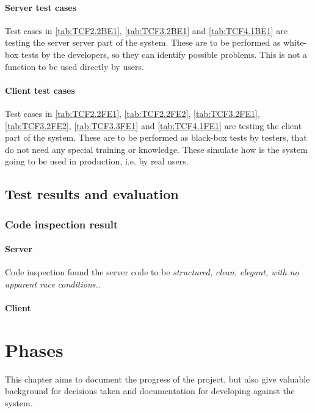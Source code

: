 \documentclass[11pt]{book}
\begin{document}
\subsubsection{Server test cases}

Test cases in \ref{tab:TCF2.2BE1}, \ref{tab:TCF3.2BE1} and \ref{tab:TCF4.1BE1} are testing the server server part of the system. These are to be performed as white-box tests by the developers, so they can identify possible problems. This is not a function to be used directly by users.

\subsubsection{Client test cases} \label{sec:fe-test-cases}

Test cases in \ref{tab:TCF2.2FE1}, \ref{tab:TCF2.2FE2}, \ref{tab:TCF3.2FE1}, \ref{tab:TCF3.2FE2}, \ref{tab:TCF3.3FE1} and \ref{tab:TCF4.1FE1} are testing the client part of the system. These are to be performed as black-box tests by testers, that do not need any special training or knowledge. These simulate how is the system going to be used in production, i.e. by real users.

\section{Test results and evaluation}

\subsection{Code inspection result}

\subsubsection{Server}

Code inspection found the server code to be \emph{structured, clean, elegant, with no apparent race conditions.}.

\subsubsection{Client}


\chapter{Phases}
This chapter aims to document the progress of the project, but also give valuable background for decisions taken and documentation for developing against the system.
\end{document}
